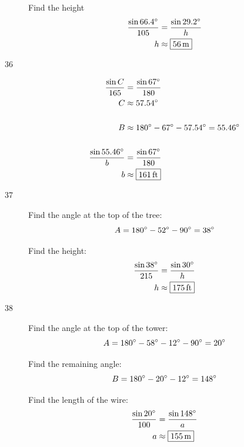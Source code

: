 \documentclass{exam}
\newcommand{\dg}{\ensuremath{^\circ}}
\begin{document}
\begin{description}
        Find the height
        \begin{align*}
          \frac{\sin 66.4 \dg}{105} & = \frac{\sin 29.2 \dg}{h} \\
          h                         & \approx \boxed{ \unit[56]{m} } \\
        \end{align*}

      \pagebreak

      \item[36] 
        \begin{align*}
          \frac{\sin C}{165} & = \frac{\sin 67 \dg}{180} \\
          C                  & \approx 57.54 \dg \\
          \\
          B & \approx 180 \dg - 67 \dg - 57.54 \dg = 55.46 \dg \\
          \\
          \frac{\sin 55.46 \dg}{b} & = \frac{\sin 67 \dg}{180} \\
          b                        & \approx \boxed{ \unit[161]{ft} } \\
        \end{align*}

      \item[37] 
        Find the angle at the top of the tree:
        \[
          A = 180 \dg - 52 \dg - 90 \dg = 38 \dg \\
        \]

        Find the height:
        \begin{align*}
          \frac{\sin 38 \dg}{215} & = \frac{\sin 30 \dg}{h} \\
          h                       & \approx \boxed{ \unit[175]{ft} } \\
        \end{align*}

      \item[38] 
        Find the angle at the top of the tower:
        \[
          A = 180 \dg - 58 \dg - 12 \dg - 90 \dg = 20 \dg \\
        \]

        Find the remaining angle:
        \[
          B = 180 \dg - 20 \dg - 12 \dg = 148 \dg \\
        \]

        Find the length of the wire:
        \begin{align*}
          \frac{\sin 20 \dg}{100} & = \frac{\sin 148 \dg}{a} \\
          a                       & \approx \boxed{ \unit[155]{m} } \\
        \end{align*}


\end{description}
\end{document}
